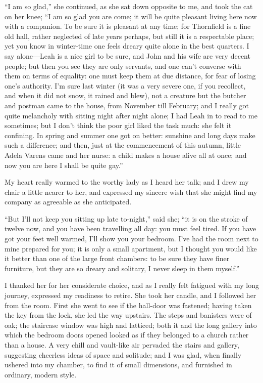 \enquote{I am so glad,} she continued, as she sat down opposite to me,
and took the cat on her knee; \enquote{I am so glad you are come; it
will be quite pleasant living here now with a companion. To be sure it
is pleasant at any time; for Thornfield is a fine old hall, rather
neglected of late years perhaps, but still it is a respectable place;
yet you know in winter-time one feels dreary quite alone in the best
quarters. I say alone---Leah is a nice girl to be sure, and John and
his wife are very decent people; but then you see they are only
servants, and one can't converse with them on terms of equality: one
must keep them at due distance, for fear of losing one's authority. I'm
sure last winter (it was a very severe one, if you recollect, and when
it did not snow, it rained and blew), not a creature but the butcher and
postman came to the house, from November till February; and I really got
quite melancholy with sitting night after night alone; I had Leah in to
read to me sometimes; but I don't think the poor girl liked the task
much: she felt it confining. In spring and summer one got on better:
sunshine and long days make such a difference; and then, just at the
commencement of this autumn, little Adela Varens came and her nurse: a
child makes a house alive all at once; and now you are here I shall be
quite gay.}

My heart really warmed to the worthy lady as I heard her talk; and I
drew my chair a little nearer to her, and expressed my sincere wish that
she might find my company as agreeable as she anticipated.

\enquote{But I'll not keep you sitting up late to-night,} said she;
\enquote{it is on the stroke of twelve now, and you have been travelling
all day: you must feel tired. If you have got your feet well warmed,
I'll show you your bedroom. I've had the room next to mine prepared for
you; it is only a small apartment, but I thought you would like it
better than one of the large front chambers: to be sure they have finer
furniture, but they are so dreary and solitary, I never sleep in them
myself.}

I thanked her for her considerate choice, and as I really felt fatigued
with my long journey, expressed my readiness to retire. She took her
candle, and I followed her from the room. First she went to see if the
hall-door was fastened; having taken the key from the lock, she led the
way upstairs. The steps and banisters were of oak; the staircase window
was high and latticed; both it and the long gallery into which the
bedroom doors opened looked as if they belonged to a church rather than
a house. A very chill and vault-like air pervaded the stairs and
gallery, suggesting cheerless ideas of space and solitude; and I was
glad, when finally ushered into my chamber, to find it of small
dimensions, and furnished in ordinary, modern style.

